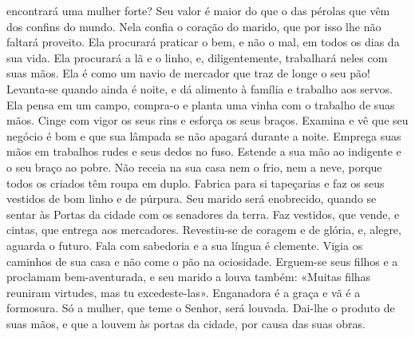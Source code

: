 \begin{paracol}{2}
{ encontrará uma mulher forte? Seu valor é maior do que o das pérolas que vêm dos confins do mundo. Nela confia o coração do marido, que por isso lhe não faltará proveito. Ela procurará praticar o bem, e não o mal, em todos os dias da sua vida. Ela procurará a lã e o linho, e, diligentemente, trabalhará neles com suas mãos. Ela é como um navio de mercador que traz de longe o seu pão! Levanta-se quando ainda é noite, e dá alimento à família e trabalho aos servos. Ela pensa em um campo, compra-o e planta uma vinha com o trabalho de suas mãos. Cinge com vigor os seus rins e esforça os seus braços. Examina e vê que seu negócio é bom e que sua lâmpada se não apagará durante a noite. Emprega suas mãos em trabalhos rudes e seus dedos no fuso. Estende a sua mão ao indigente e o seu braço ao pobre. Não receia na sua casa nem o frio, nem a neve, porque todos os criados têm roupa em duplo. Fabrica para si tapeçarias e faz os seus vestidos de bom linho e de púrpura. Seu marido será enobrecido, quando se sentar às Portas da cidade com os senadores da terra. Faz vestidos, que vende, e cintas, que entrega aos mercadores. Revestiu-se de coragem e de glória, e, alegre, aguarda o futuro. Fala com sabedoria e a sua língua é clemente. Vigia os caminhos de sua casa e não come o pão na ociosidade. Erguem-se seus filhos e a proclamam bem-aventurada, e seu marido a louva também: «Muitas filhas reuniram virtudes, mas tu excedeste-las». Enganadora é a graça e vã é a formosura. Só a mulher, que teme o Senhor, será louvada. Dai-lhe o produto de suas mãos, e que a louvem às portas da cidade, por causa das suas obras.
}\end{paracol}

\begin{paracol}{2}\switchcolumn{}\switchcolumn*{}\switchcolumn{}\end{paracol}

